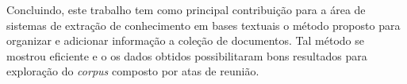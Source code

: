 

Concluindo, este trabalho tem como principal contribuição para a área de sistemas de extração de conhecimento em bases textuais o método proposto para organizar e adicionar informação a coleção de documentos. Tal método se mostrou eficiente e o os dados obtidos possibilitaram bons resultados para exploração do \textit{corpus} composto por atas de reunião.











